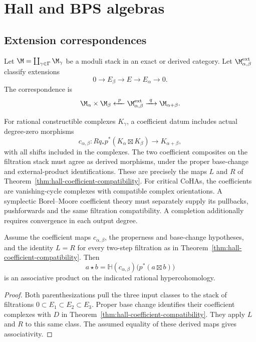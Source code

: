 \part{Hall and BPS algebras}

\chapter{Extension correspondences}
\label{ch:extension-correspondences}
Let $\M=\coprod_{\gamma\in\Gamma}\M_\gamma$ be a moduli stack in an exact or derived category. Let $\M^{\mathrm{ext}}_{\alpha,\beta}$ classify extensions
\[
 0\longrightarrow E_\beta\longrightarrow E\longrightarrow E_\alpha\longrightarrow0.
\]
The correspondence is
\[
 \M_\alpha\times\M_\beta
 \xleftarrow{\ p\ }
 \M^{\mathrm{ext}}_{\alpha,\beta}
 \xrightarrow{\ q\ }
 \M_{\alpha+\beta}.
\]

For rational constructible complexes $K_\gamma$, a coefficient datum includes
actual degree-zero morphisms
\[
 c_{\alpha,\beta}:Rq_*p^*(K_\alpha\boxtimes K_\beta)
 \longrightarrow K_{\alpha+\beta},
\]
with all shifts included in the complexes. The two coefficient composites
on the filtration stack must agree as derived morphisms, under the proper
base-change and external-product identifications. These are precisely the
maps $L$ and $R$ of Theorem~\ref{thm:hall-coefficient-compatibility}.
For critical CoHAs, the coefficients are vanishing-cycle complexes with
compatible complex orientations. A symplectic Borel--Moore coefficient
theory must separately supply its pullbacks, pushforwards and the same
filtration compatibility. A completion additionally requires convergence
in each output degree.

\begin{theorem}
Assume the coefficient maps $c_{\alpha,\beta}$, the properness and
base-change hypotheses, and the identity $L=R$ for every two-step
filtration as in Theorem~\ref{thm:hall-coefficient-compatibility}. Then
\[
 a\star b=\mathbb H(c_{\alpha,\beta})\bigl(p^*(a\boxtimes b)\bigr)
\]
is an associative product on the indicated rational hypercohomology.
\end{theorem}
\begin{proof}
Both parenthesizations pull the three input classes to the stack of
filtrations $0\subset E_1\subset E_2\subset E_3$. Proper base change
identifies their coefficient complexes with $D$ in
Theorem~\ref{thm:hall-coefficient-compatibility}. They apply $L$ and $R$
to this same class. The assumed equality of these derived maps gives
associativity.
\end{proof}

